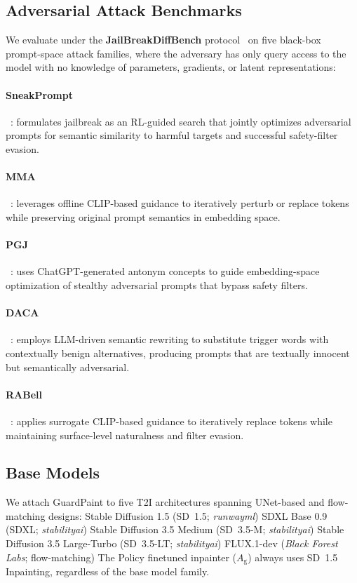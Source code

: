 \documentclass[11pt]{article}
\newcommand{\Ag}{A_{\mathrm{g}}}
\begin{document}
\subsection{Adversarial Attack Benchmarks}

We evaluate under the \textbf{JailBreakDiffBench}
protocol~\cite{jailbreakdiffbench2024} on five black-box prompt-space attack families, where the adversary has only query access to the model with no knowledge of parameters, gradients, or latent representations:
\paragraph{ \textbf{SneakPrompt}}~\cite{yang2023sneakprompt}: formulates jailbreak as an RL-guided search that jointly optimizes adversarial prompts for semantic similarity to harmful targets and successful safety-filter evasion.
\paragraph{
\textbf{MMA}}~\cite{mma2024}: leverages offline CLIP-based guidance to iteratively perturb or replace tokens while preserving original prompt semantics in embedding space.
  \paragraph{\textbf{PGJ}}~\cite{pgj2024}: uses ChatGPT-generated antonym concepts to guide embedding-space optimization of stealthy adversarial prompts that bypass safety filters.
  \paragraph{\textbf{DACA}}~\cite{daca2024}: employs LLM-driven semantic rewriting to substitute trigger words with contextually benign alternatives, producing prompts that are textually innocent but semantically adversarial.
  \paragraph{\textbf{RABell}}~\cite{rabell2024}: applies surrogate CLIP-based guidance to iteratively replace tokens while maintaining surface-level naturalness and filter evasion.

\subsection{Base Models}

We attach GuardPaint to five T2I architectures spanning UNet-based
and flow-matching designs:
   Stable Diffusion 1.5 (SD~1.5; \textit{runwayml}) \cite{rombach2022ldm}
  SDXL Base 0.9 (SDXL; \textit{stabilityai}) \cite{podell2023sdxl}
  Stable Diffusion 3.5 Medium (SD~3.5-M; \textit{stabilityai})\cite{esser2024sd3}
  Stable Diffusion 3.5 Large-Turbo (SD~3.5-LT; \textit{stabilityai})
  FLUX.1-dev (\textit{Black Forest Labs}; flow-matching) \cite{flux1dev2026}
The Policy finetuned inpainter ($\Ag$) always uses SD~1.5 Inpainting, regardless of the base model family.
\end{document}
